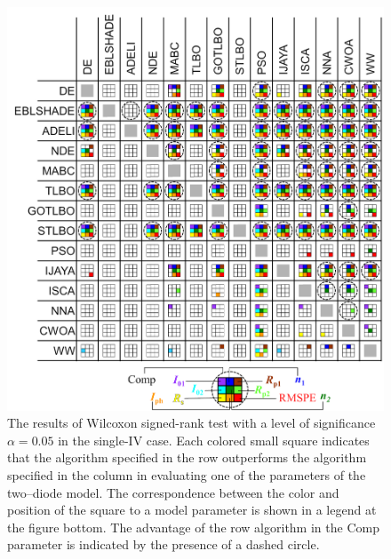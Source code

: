 \documentclass[a4paper,fleqn]{cas-dc}
\begin{document}
\begin{figure}[]
	\centering
		\includegraphics[width=1.0\columnwidth]{Fig4}
	  \caption{The results of Wilcoxon signed-rank test with a level of significance $\alpha = 0.05$ in the single-IV case.
               Each colored small square indicates that the algorithm specified in the row outperforms the algorithm 
               specified in the column in evaluating one of the parameters of the two--diode model.
               The correspondence between the color and position of the square to a model parameter 
               is shown in a legend at the figure bottom.
               The advantage of the row algorithm in the Comp parameter is indicated by the presence of a dashed circle.}\label{figWilSingleIV}
\end{figure}
\end{document}
